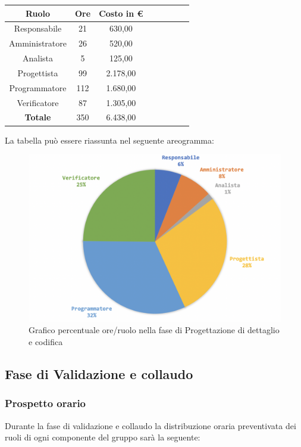 		\begin{longtable}{|c|c|c|c|c|c|c|c}
			\hline
			\rowcolor{lighter-grayer}
			\textbf{Ruolo} & \textbf{Ore} & \textbf{Costo in € } \\
			\hline
			\endfirsthead
			
			\hline
			Responsabile 	    & 21 & 630,00\\
			\hline 
			\hline
			Amministratore	  & 26 & 520,00\\
			\hline
			\hline
			Analista 				& 5 & 125,00\\
			\hline
			\hline
			Progettista 		  & 99 & 2.178,00\\
			\hline
			\hline
			Programmatore 	 & 112 & 1.680,00\\
			\hline
			\hline
			Verificatore 		  & 87 & 1.305,00\\
			\hline
			\textbf{Totale} 	& 350 & 6.438,00\\
			\hline
			
		\end{longtable}
		\pagebreak
		
		La tabella può essere riassunta nel seguente areogramma:
		\begin{figure}[H]
			\centering
			\includegraphics[width=0.8\linewidth]{./images/progDetCod2.png}
			\caption{Grafico percentuale ore/ruolo nella fase di Progettazione di dettaglio e codifica}
			\label{fig:grafico costi ruolo fase Progettazione dettaglio e codifica}
		\end{figure}
	
		\subsection{Fase di Validazione e collaudo}
		\subsubsection{Prospetto orario}
		Durante la fase di validazione e collaudo la distribuzione oraria preventivata dei ruoli di ogni componente del gruppo sarà la seguente:
		
